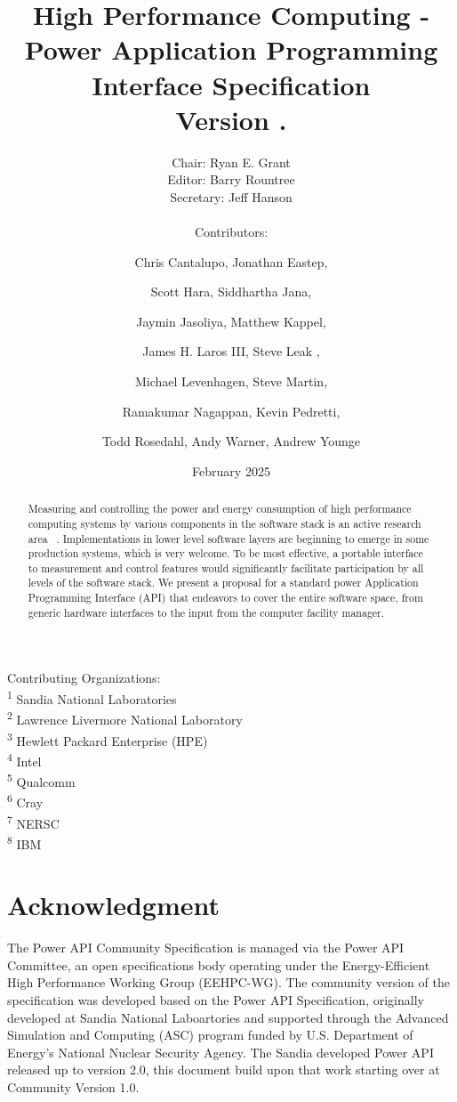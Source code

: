 \documentclass[12pt]{report}
\title{High Performance Computing - Power Application Programming Interface Specification \\ Version \majorversion.\minorversion }
\author{Chair: Ryan E. Grant\Mark{1} 
\\ Editor: Barry Rountree\Mark{2} 
\\ Secretary: Jeff Hanson\Mark{3} 
\\ \\ Contributors:  
\and Chris Cantalupo\Mark{4}, Jonathan Eastep\Mark{4}, 
\and Scott Hara\Mark{5}, Siddhartha Jana\Mark{4},\\ 
\and Jaymin Jasoliya\Mark{4}, Matthew Kappel\Mark{6}, \\ 
\and James H. Laros III\Mark{1}, Steve Leak \Mark{7}, \\ 
\and Michael Levenhagen\Mark{1}, Steve Martin\Mark{6}, \\
\and Ramakumar Nagappan\Mark{4}, Kevin Pedretti\Mark{1}, \\
\and Todd Rosedahl\Mark{8}, Andy Warner\Mark{3}, Andrew Younge\Mark{1}}
\date{February 2025}
\newcommand\Mark[1]{\textsuperscript#1}
\begin{document}
\maketitle

\noindent Contributing Organizations: \\
\Mark{1} Sandia National Laboratories \\
\Mark{2} Lawrence Livermore National Laboratory \\
\Mark{3} Hewlett Packard Enterprise (HPE) \\
\Mark{4} Intel \\
\Mark{5} Qualcomm \\
\Mark{6} Cray \\
\Mark{7} NERSC \\
\Mark{8} IBM \\


\begin{abstract}
Measuring and controlling the power and energy consumption of high performance computing systems by various components in the software stack is an active research area 
~\cite{6604474,6604496,
5488433,
Liu:2012:RCA:2318857.2254779,
Chen:2013:DSP:2561828.2561853,
Yang:2013:IDP:2503210.2503264,
Wallace:2013:CLUSTER:2503210.2503264,
Shoukourian2013,
conf:icdcn:GeorgiouCGAJH14,
Trader:2013:report:GreenComputing,
6337489,
Vishnu:2013:JSC:s11227-011-0699-9,
Mills:2013:EES:2536430.2536432,
Bertran:2013:IBM:2012.2227580,
Georgiou:2013:Bull,
6604481,
6604508}.
Implementations in lower level software layers are beginning to emerge in some production systems, which is very welcome.
To be most effective, a portable interface to measurement and control features would significantly facilitate participation by all levels of the software stack.
We present a proposal for a standard power Application Programming Interface (API) that endeavors to cover the entire software space, from generic hardware interfaces to the input from the computer facility manager.

    \end{abstract}
    \chapter{Acknowledgment}

The Power API Community Specification is managed via the Power API Committee, an open specifications body operating under the Energy-Efficient High Performance Working Group (EEHPC-WG).
The community version of the specification was developed based on the Power API Specification, originally developed at Sandia National Laboartories and supported through the Advanced Simulation and Computing (ASC) program funded by U.S. Department of Energy's National Nuclear Security Agency. The Sandia developed Power API released up to version 2.0, this document build upon that work starting over at Community Version 1.0.
\end{document}
